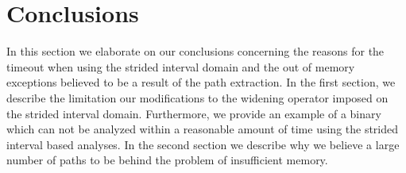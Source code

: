 \documentclass{kththesis}
\begin{document}
\clearpage

\section{Conclusions}\label{sec:conclusions}
In this section we elaborate on our conclusions concerning the reasons for the timeout when using the strided interval domain and the out of memory exceptions believed to be a result of the path extraction. In the first section, we describe the limitation our modifications to the widening operator imposed on the strided interval domain. Furthermore, we provide an example of a binary which can not be analyzed within a reasonable amount of time using the strided interval based analyses. In the second section we describe why we believe a large number of paths to be behind the problem of insufficient memory. 
\end{document}
